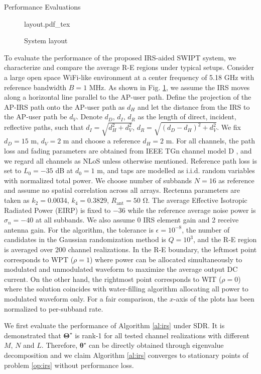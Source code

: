 \documentclass[journal]{IEEEtran}
\begin{document}
\begin{section}{Performance Evaluations}\label{se:performance_evaluation}
	\begin{figure}
		\centering
		\def\svgwidth{\columnwidth}
		{layout.pdf_tex}
		\caption{System layout}
		\label{fi:layout}
	\end{figure}
	To evaluate the performance of the proposed IRS-aided SWIPT system, we characterize and compare the average R-E regions under typical setups. Consider a large open space WiFi-like environment at a center frequency of 5.18 \si{\GHz} with reference bandwidth $B=1$ \si{\MHz}. As shown in Fig. \ref{fi:layout}, we assume the IRS moves along a horizontal line parallel to the AP-user path. Define the projection of the AP-IRS path onto the AP-user path as $d_H$ and let the distance from the IRS to the AP-user path be $d_V$. Denote $d_D$, $d_I$, $d_R$ as the length of direct, incident, reflective paths, such that $d_I=\sqrt{d_H^2+d_V^2}$, $d_R=\sqrt{(d_D-d_H)^2+d_V^2}$. We fix $d_D=15$ \si{\meter}, $d_V=2$ \si{\meter} and choose a reference $d_H=2$ \si{\meter}. For all channels, the path loss and fading parameters are obtained from IEEE TGn channel model D \cite{Erceg2004}, and we regard all channels as NLoS unless otherwise mentioned. Reference path loss is set to $L_0=-35$ \si{\dB} at $d_0=1$ \si{\meter}, and taps are modelled as i.i.d. random variables with normalized total power. We choose number of subbands $N=16$ as reference and assume no spatial correlation across all arrays. Rectenna parameters are taken as $k_2=0.0034$, $k_4=0.3829$, $R_{\text{ant}}=50$ \si{\ohm}. The average Effective Isotropic Radiated Power (EIRP) is fixed to $-36$ \si{\dBm} while the reference average noise power is $\sigma_n=-40$ \si{\dBm} at all subbands. We also assume 0 \si{\dBi} IRS element gain and 2 \si{\dBi} receive antenna gain. For the algorithm, the tolerance is $\epsilon=10^{-8}$, the number of candidates in the Gaussian randomization method is $Q=10^{3}$, and the R-E region is averaged over 200 channel realizations. In the R-E boundary, the leftmost point corresponds to WPT ($\rho=1$) where power can be allocated simultaneously to modulated and unmodulated waveform to maximize the average output DC current. On the other hand, the rightmost point corresponds to WIT ($\rho=0$) where the solution coincides with water-filling algorithm allocating all power to modulated waveform only. For a fair comparison, the $x$-axis of the plots has been normalized to per-subband rate.

	We first evaluate the performance of Algorithm \ref{al:irs} under SDR. It is demonstrated that $\boldsymbol{\Theta}^{\star}$ is rank-1 for all tested channel realizations with different $M$, $N$ and $L$. Therefore, $\boldsymbol{\theta}^{\star}$ can be directly obtained through eigenvalue decomposition and we claim Algorithm \ref{al:irs} converges to stationary points of problem \ref{op:irs} without performance loss.


\end{section}
\end{document}
